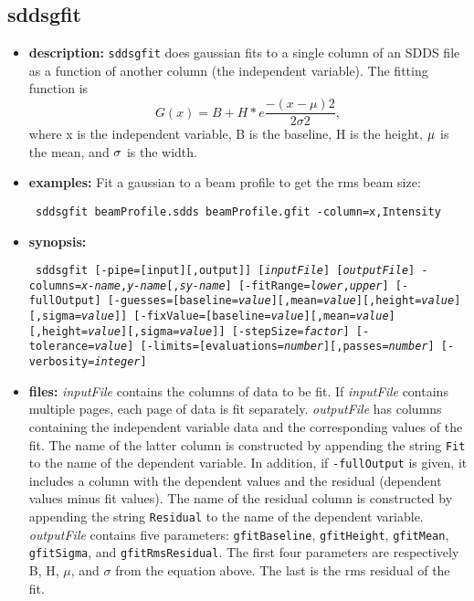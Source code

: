 \begin{latexonly}
\newpage
\end{latexonly}
\subsection{sddsgfit}
\label{sddsgfit}

\begin{itemize}
\item {\bf description:}
{\tt sddsgfit} does gaussian fits to a single column of an SDDS file as a function of another column (the independent 
variable).  The fitting function is
\[ G(x) = B + H * e \frac{-(x-\mu) 2}{2 \sigma 2}, \]
where x is the independent variable, B is the baseline, H is the height, ${\rm \mu}$ is the mean,
and ${\rm \sigma}$ is the width.

\item {\bf examples:} 
Fit a gaussian to a beam profile to get the rms beam size:
\begin{flushleft}{\tt
sddsgfit beamProfile.sdds beamProfile.gfit -column=x,Intensity 
}\end{flushleft}
\item {\bf synopsis:} 
\begin{flushleft}{\tt
sddsgfit [-pipe=[input][,output]] [{\em inputFile}] [{\em outputFile}] 
-columns={\em x-name},{\em y-name}[,{\em sy-name}] 
[-fitRange={\em lower},{\em upper}] [-fullOutput] 
[-guesses=[baseline={\em value}][,mean={\em value}][,height={\em value}][,sigma={\em value}]] 
[-fixValue=[baseline={\em value}][,mean={\em value}][,height={\em value}][,sigma={\em value}]] 
[-stepSize={\em factor}] [-tolerance={\em value}] 
[-limits=[evaluations={\em number}][,passes={\em number}]
[-verbosity={\em integer}] 
}\end{flushleft}
\item {\bf files:}
{\em inputFile} contains the columns of data to be fit.  If {\em inputFile} contains multiple
pages, each page of data is fit separately.  {\em outputFile} has columns containing the
independent variable data and the corresponding values of the fit.  The name of the latter
column is constructed by appending the string {\tt Fit} to the name of the dependent variable.
In addition, if {\tt -fullOutput} is given, it includes a column with the dependent values and
the residual (dependent values minus fit values).  The name of the residual column is
constructed by appending the string {\tt Residual} to the name of the dependent variable.  {\em
outputFile} contains five parameters: {\tt gfitBaseline}, {\tt gfitHeight}, {\tt gfitMean},
{\tt gfitSigma}, and {\tt gfitRmsResidual}.  The first four parameters are respectively B, H,
$\mu$, and $\sigma$ from the equation above.  The last is the rms residual of the fit.


\end{itemize}
